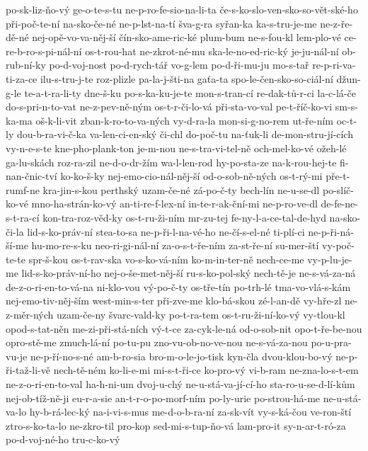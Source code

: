 po-sk-liz-ňo-vý
ge-o-te-s-tu
ne-p-ro-fe-sio-na-li-ta
če-s-ko-slo-ven-sko-so-vět-ské-ho
při-poč-te-ní
na-sko-če-né
ne-p-lst-na-tí
šva-g-ra
syřan-ka
ka-s-tru-je-me
ne-z-ře-dě-né
nej-opě-vo-va-něj-ší
čín-sko-ame-ric-ké
plum-bum
ne-s-fou-kl
lem-plo-vé
ce-re-b-ro-s-pi-nál-ní
os-t-rou-hat
ne-zkrot-né-mu
ska-le-no-ed-ric-ký
je-ju-nál-ní
ob-rub-ní-ky
po-d-voj-nost
po-d-rych-tář
vo-g-lem
po-d-ři-mu-ju
mo-s-tař
re-p-ri-va-ti-za-ce
ilu-s-tru-j-te
roz-plizle
pa-la-j-šti-na
gaťa-ta
spo-le-čen-sko-so-ciál-ní
džun-g-le
te-a-t-ra-li-ty
dne-š-ku
po-s-ka-ku-je-te
mon-s-tran-cí
re-dak-tů-r-ci
la-c-lá-če
do-s-pri-n-to-vat
ne-z-pev-ně-ným
os-t-r-či-lo-vá
při-sta-vo-val
pe-t-říč-ko-vi
sm-s-ka-ma
oš-k-li-vit
zban-k-ro-to-va-ných
vy-d-ra-la
mon-si-g-no-rem
ut-ře-ním
oc-t-ly
dou-b-ra-vi-č-ka
va-len-ci-en-ský
či-chl
do-poč-tu
na-ťuk-li
de-mon-stru-jí-cích
vy-n-e-s-te
kne-pho-plank-ton
je-m-nou
ne-s-tra-vi-tel-ně
och-mel-ko-vé
ožeh-lé
ga-lu-skách
roz-ra-zil
ne-d-o-dr-žím
wa-l-len-rod
hy-po-sta-ze
na-k-rou-hej-te
fi-nan-čnic-tví
ko-ko-š-ky
nej-emo-cio-nál-něj-ší
od-o-sob-ně-ných
os-t-rý-mi
pře-t-rumf-ne
kra-jin-s-kou
perthský
uzam-če-né
zá-po-č-ty
bech-lín
ne-u-se-dl
po-slíč-ko-vé
mno-ha-strán-ko-vý
an-ti-re-f-lex-ní
in-te-r-ak-ční-mi
ne-p-ro-ve-dl
de-fe-ne-s-t-ra-cí
kon-tra-roz-věd-ky
os-t-ru-ži-ním
mr-zu-tej
fe-ny-l-a-ce-tal-de-hyd
na-sko-či-la
lid-s-ko-práv-ní
stea-to-sa
ne-p-ři-l-na-vé-ho
ne-čí-s-el-né
ti-plí-ci
ne-p-ři-ná-ší-me
hu-mo-re-s-ku
neo-ri-gi-nál-ní
za-o-s-t-ře-ním
za-st-ře-ní
su-mer-ští
vy-poč-te-te
spr-š-kou
os-t-rav-ska
vo-s-ko-vá-ním
ko-m-in-ter-ně
nech-ce-me
vy-p-lu-je-me
lid-s-ko-práv-ní-ho
nej-o-še-met-něj-ší
ru-s-ko-pol-ský
nech-tě-je
ne-s-vá-za-ná
de-z-o-ri-en-to-vá-na
ni-klo-vou
vý-po-č-ty
os-tře-tín
po-trh-lé
tma-vo-vlá-s-kám
nej-emo-tiv-něj-ším
west-min-s-ter
při-zve-me
klo-bá-skou
zé-l-an-dě
vy-hře-zl
ne-z-měr-ných
uzam-če-ny
švarc-vald-ky
po-t-ra-tem
os-t-ru-ži-ní-ko-vý
vy-tlou-kl
opod-s-tat-něn
me-zi-při-stá-ních
vý-t-ce
za-cyk-le-ná
od-o-sob-nit
opo-t-ře-be-nou
opro-stě-me
zmuch-lá-ní
po-tu-pu
zno-vu-ob-no-ve-nou
ne-s-vá-za-nou
po-u-pra-vu-je
ne-p-ří-no-s-né
am-b-ro-sia
bro-m-o-le-jo-tisk
kyn-čla
dvou-klou-bo-vý
ne-p-ři-taž-li-vě
nech-tě-ném
ko-li-e-mi
mi-s-t-ři-ce
ko-pro-vý
vi-b-ram
ne-zna-lo-s-t-em
ne-z-o-ri-en-to-val
ha-h-ni-um
dvoj-u-chý
ne-u-stá-va-jí-cí-ho
sta-ro-u-se-d-lí-kům
nej-ob-tíž-ně-ji
eu-r-a-sie
an-t-r-o-po-morf-ním
po-ly-urie
po-strou-há-me
ne-u-stá-va-lo
hy-b-rá-lec-ký
na-i-vi-s-mus
me-d-o-b-ra-ní
za-sk-vít
vy-s-ká-čou
ve-ron-ští
ztro-s-ko-ta-lo
ne-zkro-til
pro-kop
sed-mi-s-tup-ňo-vá
lam-pro-it
sy-n-ar-t-ró-za
po-d-voj-né-ho
tru-c-ko-vý
